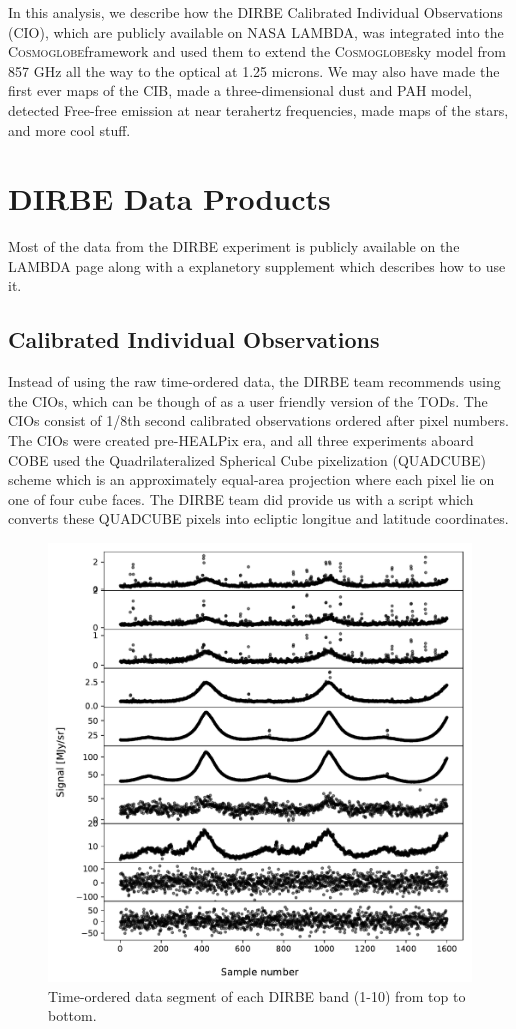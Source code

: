 \documentclass{aa}
\def\Cosmoglobe{\textsc{Cosmoglobe}}
\begin{document}
In this analysis, we describe how the DIRBE Calibrated Individual Observations (CIO), which are publicly available on NASA LAMBDA, was integrated into the \Cosmoglobe framework and used them to extend the \Cosmoglobe sky model from 857 GHz all the way to the optical at 1.25 microns. We may also have made the first ever maps of the CIB, made a three-dimensional dust and PAH model, detected Free-free emission at near terahertz frequencies, made maps of the stars, and more cool stuff.

\section{DIRBE Data Products}
Most of the data from the DIRBE experiment is publicly available on the LAMBDA page along with a explanetory supplement which describes how to use it.

\subsection{Calibrated Individual Observations}
Instead of using the raw time-ordered data, the DIRBE team recommends using the CIOs, which can be though of as a user friendly version of the TODs. The CIOs consist of 1/8th second calibrated observations ordered after pixel numbers. The CIOs were created pre-HEALPix era, and all three experiments aboard COBE used the Quadrilateralized Spherical Cube pixelization (QUADCUBE) scheme which is an approximately equal-area projection where each pixel lie on one of four cube faces. The DIRBE team did provide us with a script which converts these QUADCUBE pixels into ecliptic longitue and latitude coordinates.

\begin{figure}
  \centering
   	\includegraphics[width=\linewidth]{figs/cios.pdf}
  	\caption{Time-ordered data segment of each DIRBE band (1-10) from top to bottom.}
	\label{fig: cios}
\end{figure}
\end{document}
